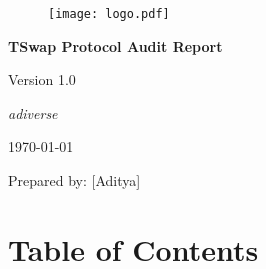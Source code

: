\begin{titlepage}
    \centering
    \begin{figure}[h]
        \centering
        \texttt{[image: logo.pdf]} 
    \end{figure}
    \vspace*{2cm}
    {\Huge\bfseries TSwap Protocol Audit Report\par}
    \vspace{1cm}
    {\Large Version 1.0\par}
    \vspace{2cm}
    {\Large\itshape adiverse\par}
    \vfill
    {\large \today\par}
\end{titlepage}

\maketitle

Prepared by: {[}Aditya{]}

\section{Table of Contents}\label{table-of-contents}

